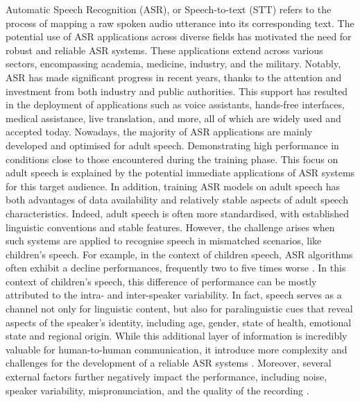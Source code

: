 \label{chap:Chapter2}
\cleardoublepage
Automatic Speech Recognition (ASR), or Speech-to-text (STT) refers to the process of mapping a raw spoken audio utterance into its corresponding text. 
The potential use of ASR applications across diverse fields has motivated the need for robust and reliable ASR systems. These applications extend across various sectors, encompassing academia, medicine, industry, and the military. Notably, ASR has made significant progress in recent years, thanks to the attention and investment from both industry and public authorities. This support has resulted in the deployment of applications such as voice assistants, hands-free interfaces, medical assistance, live translation, and more, all of which are widely used and accepted today.
Nowadays, the majority of ASR applications are mainly developed and optimised for adult speech. Demonstrating high performance in conditions close to those encountered during the training phase. This focus on adult speech is explained by the potential immediate applications of ASR systems for this target audience. In addition, training ASR models on adult speech has both advantages of data availability and relatively stable aspects of adult speech characteristics. Indeed, adult speech is often more standardised, with established linguistic conventions and stable features.
However, the challenge arises when such systems are applied to recognise speech in mismatched scenarios, like children's speech. For example, in the context of children speech, ASR algorithms often exhibit a decline performances, frequently two to five times worse \cite{childrenSpeechWorse}. In this context of children's speech, this difference of performance can be mostly attributed to the intra- and inter-speaker variability. In fact, speech serves as a channel not only for linguistic content, but also for paralinguistic cues that reveal aspects of the speaker's identity, including age, gender, state of health, emotional state and regional origin. While this additional layer of information is incredibly valuable for human-to-human communication, it introduce more complexity and challenges for the development of a reliable ASR systems \cite{li2023asr}.
Moreover, several external factors further negatively impact the performance, including noise, speaker variability, mispronunciation, and the quality of the recording \cite{li2014overview,king2017robust}.


